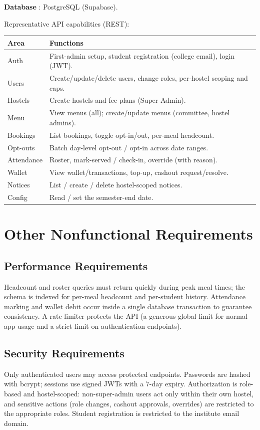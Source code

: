 \documentclass{scrreprt}
\begin{document}
\textbf{Database} : PostgreSQL (Supabase).

\medskip

Representative API capabilities (REST):

\begin{longtable}{>{\raggedright\arraybackslash}p{4cm} p{9.5cm}}
    \textbf{Area} & \textbf{Functions} \\ \hline
    \endhead
    Auth & First-admin setup, student registration (college email), login (JWT). \\
    Users & Create/update/delete users, change roles, per-hostel scoping and caps. \\
    Hostels & Create hostels and fee plans (Super Admin). \\
    Menu & View menus (all); create/update menus (committee, hostel admins). \\
    Bookings & List bookings, toggle opt-in/out, per-meal headcount. \\
    Opt-outs & Batch day-level opt-out / opt-in across date ranges. \\
    Attendance & Roster, mark-served / check-in, override (with reason). \\
    Wallet & View wallet/transactions, top-up, cashout request/resolve. \\
    Notices & List / create / delete hostel-scoped notices. \\
    Config & Read / set the semester-end date. \\
\end{longtable}
\chapter{Other Nonfunctional Requirements}

\section{Performance Requirements}
Headcount and roster queries must return quickly during peak meal times;
the schema is indexed for per-meal headcount and per-student history.
Attendance marking and wallet debit occur inside a single database
transaction to guarantee consistency. A rate limiter protects the API
(a generous global limit for normal app usage and a strict limit on
authentication endpoints).

\section{Security Requirements}
Only authenticated users may access protected endpoints. Passwords are
hashed with bcrypt; sessions use signed JWTs with a 7-day expiry.
Authorization is role-based and hostel-scoped: non-super-admin users act
only within their own hostel, and sensitive actions (role changes,
cashout approvals, overrides) are restricted to the appropriate roles.
Student registration is restricted to the institute email domain.
\end{document}
